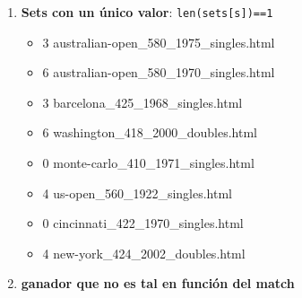 \documentclass[a4paper,10pt]{article}
\begin{document}
\begin{enumerate}
\item \textbf{Sets con un \'unico valor}: \texttt{len(sets[s])==1}
\begin{itemize}
 \item 3 australian-open\_580\_1975\_singles.html
  \item 6 australian-open\_580\_1970\_singles.html
  \item 3 barcelona\_425\_1968\_singles.html
  \item 6 washington\_418\_2000\_doubles.html
  \item 0 monte-carlo\_410\_1971\_singles.html
  \item 4 us-open\_560\_1922\_singles.html
  \item 0 cincinnati\_422\_1970\_singles.html
  \item 4 new-york\_424\_2002\_doubles.html

\end{itemize}

\item \textbf{ganador que no es tal en funci\'on del match} 


\end{enumerate}
\end{document}
